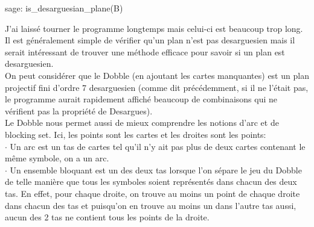 \documentclass[a4paper]{article}
\begin{document}
\begin{sageverbatim}
 sage: is_desarguesian_plane(B)
  
\end{sageverbatim}
J'ai laissé tourner le programme longtemps mais celui-ci est beaucoup trop long. Il est généralement simple de vérifier qu'un plan n'est pas desarguesien mais il serait intéressant de trouver une méthode efficace pour savoir si un plan est desarguesien.\\ 
On peut considérer que le Dobble (en ajoutant les cartes manquantes) est un plan projectif fini d'ordre 7 desarguesien (comme dit précédemment, si il ne l'était pas, le programme aurait rapidement affiché beaucoup de combinaisons qui ne vérifient pas la propriété de Desargues).
\bigskip\\
Le Dobble nous permet aussi de mieux comprendre les notions d'arc et de blocking set. Ici, les points sont les cartes et les droites sont les points:\\
$\cdot$ Un arc est un tas de cartes tel qu'il n'y ait pas plus de deux cartes contenant le même symbole, on a un arc. \\
$\cdot$ Un ensemble bloquant est un des deux tas lorsque l'on sépare le jeu du Dobble de telle manière que tous les symboles soient représentés dans chacun des deux tas. En effet, pour chaque droite, on trouve au moins un point de chaque droite dans chacun des tas et puisqu'on en trouve au moins un dans l'autre tas aussi, aucun des 2 tas ne contient tous les points de la droite.
\newpage
\end{document}
